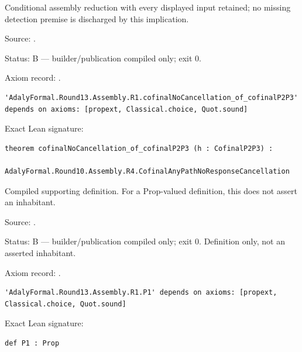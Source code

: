 \begin{theorem}[bp-554]
\label{bp-554}
\leanok
Conditional assembly reduction with every displayed input retained; no missing detection premise is discharged by this implication.

\par Source: \texttt{}.
\par Status: B — builder/publication compiled only; exit 0.
\par Axiom record: \texttt{}.
\begin{verbatim}
'AdalyFormal.Round13.Assembly.R1.cofinalNoCancellation_of_cofinalP2P3' depends on axioms: [propext, Classical.choice, Quot.sound]
\end{verbatim}
\par Exact Lean signature:
\begin{verbatim}
theorem cofinalNoCancellation_of_cofinalP2P3 (h : CofinalP2P3) :
    AdalyFormal.Round10.Assembly.R4.CofinalAnyPathNoResponseCancellation
\end{verbatim}
\end{theorem}

\begin{definition}[bp-555]
\label{bp-555}
\uses{}
\leanok
Compiled supporting definition. For a Prop-valued definition, this does not assert an inhabitant.

\par Source: \texttt{}.
\par Status: B — builder/publication compiled only; exit 0. Definition only, not an asserted inhabitant.
\par Axiom record: \texttt{}.
\begin{verbatim}
'AdalyFormal.Round13.Assembly.R1.P1' depends on axioms: [propext, Classical.choice, Quot.sound]
\end{verbatim}
\par Exact Lean signature:
\begin{verbatim}
def P1 : Prop
\end{verbatim}
\end{definition}

